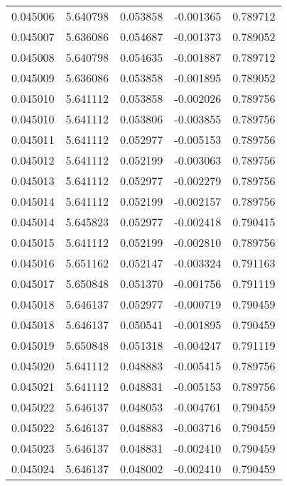\begin{tabular}{lrrrr}
0.045006    &  5.640798 &  0.053858 & -0.001365 &             0.789712 \\
0.045007    &  5.636086 &  0.054687 & -0.001373 &             0.789052 \\
0.045008    &  5.640798 &  0.054635 & -0.001887 &             0.789712 \\
0.045009    &  5.636086 &  0.053858 & -0.001895 &             0.789052 \\
0.045010    &  5.641112 &  0.053858 & -0.002026 &             0.789756 \\
0.045010    &  5.641112 &  0.053806 & -0.003855 &             0.789756 \\
0.045011    &  5.641112 &  0.052977 & -0.005153 &             0.789756 \\
0.045012    &  5.641112 &  0.052199 & -0.003063 &             0.789756 \\
0.045013    &  5.641112 &  0.052977 & -0.002279 &             0.789756 \\
0.045014    &  5.641112 &  0.052199 & -0.002157 &             0.789756 \\
0.045014    &  5.645823 &  0.052977 & -0.002418 &             0.790415 \\
0.045015    &  5.641112 &  0.052199 & -0.002810 &             0.789756 \\
0.045016    &  5.651162 &  0.052147 & -0.003324 &             0.791163 \\
0.045017    &  5.650848 &  0.051370 & -0.001756 &             0.791119 \\
0.045018    &  5.646137 &  0.052977 & -0.000719 &             0.790459 \\
0.045018    &  5.646137 &  0.050541 & -0.001895 &             0.790459 \\
0.045019    &  5.650848 &  0.051318 & -0.004247 &             0.791119 \\
0.045020    &  5.641112 &  0.048883 & -0.005415 &             0.789756 \\
0.045021    &  5.641112 &  0.048831 & -0.005153 &             0.789756 \\
0.045022    &  5.646137 &  0.048053 & -0.004761 &             0.790459 \\
0.045022    &  5.646137 &  0.048883 & -0.003716 &             0.790459 \\
0.045023    &  5.646137 &  0.048831 & -0.002410 &             0.790459 \\
0.045024    &  5.646137 &  0.048002 & -0.002410 &             0.790459 \\

\end{tabular}
